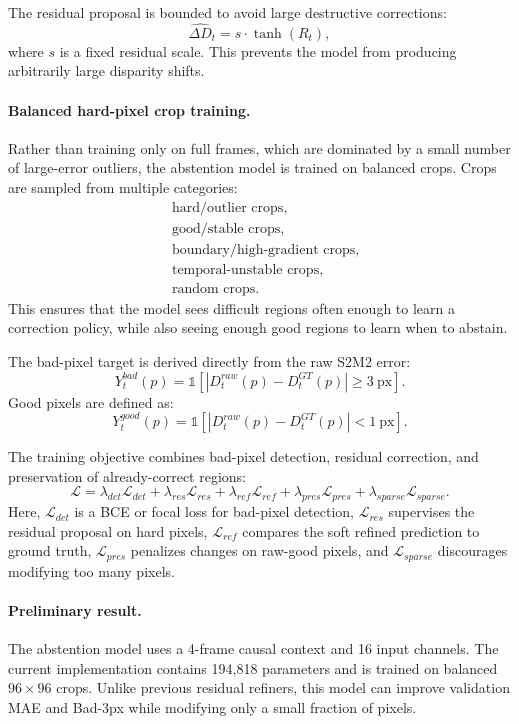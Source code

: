 \documentclass[11pt,a4paper]{article}
\begin{document}
The residual proposal is bounded to avoid large destructive corrections:
\[
\widehat{\Delta D}_t
=
s \cdot \tanh(R_t),
\]
where \(s\) is a fixed residual scale. This prevents the model from producing
arbitrarily large disparity shifts.

\paragraph{Balanced hard-pixel crop training.}
Rather than training only on full frames, which are dominated by a small number
of large-error outliers, the abstention model is trained on balanced crops. Crops
are sampled from multiple categories:
\[
\begin{aligned}
&\text{hard/outlier crops}, \\
&\text{good/stable crops}, \\
&\text{boundary/high-gradient crops}, \\
&\text{temporal-unstable crops}, \\
&\text{random crops}.
\end{aligned}
\]
This ensures that the model sees difficult regions often enough to learn a
correction policy, while also seeing enough good regions to learn when to
abstain.

The bad-pixel target is derived directly from the raw S2M2 error:
\[
Y_t^{bad}(p)
=
\mathbb{1}
\left[
|D_t^{raw}(p) - D_t^{GT}(p)| \geq 3~\mathrm{px}
\right].
\]
Good pixels are defined as:
\[
Y_t^{good}(p)
=
\mathbb{1}
\left[
|D_t^{raw}(p) - D_t^{GT}(p)| < 1~\mathrm{px}
\right].
\]

The training objective combines bad-pixel detection, residual correction, and
preservation of already-correct regions:
\[
\mathcal{L}
=
\lambda_{det}\mathcal{L}_{det}
+
\lambda_{res}\mathcal{L}_{res}
+
\lambda_{ref}\mathcal{L}_{ref}
+
\lambda_{pres}\mathcal{L}_{pres}
+
\lambda_{sparse}\mathcal{L}_{sparse}.
\]
Here, \(\mathcal{L}_{det}\) is a BCE or focal loss for bad-pixel detection,
\(\mathcal{L}_{res}\) supervises the residual proposal on hard pixels,
\(\mathcal{L}_{ref}\) compares the soft refined prediction to ground truth,
\(\mathcal{L}_{pres}\) penalizes changes on raw-good pixels, and
\(\mathcal{L}_{sparse}\) discourages modifying too many pixels.

\paragraph{Preliminary result.}
The abstention model uses a 4-frame causal context and 16 input channels. The
current implementation contains 194,818 parameters and is trained on balanced
\(96 \times 96\) crops. Unlike previous residual refiners, this model can improve
validation MAE and Bad-3px while modifying only a small fraction of pixels.
\end{document}
